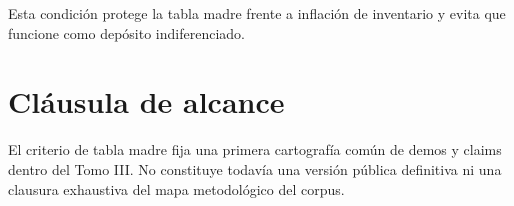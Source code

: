 \begin{observation}
Esta condición protege la tabla madre frente a inflación de inventario y evita que funcione como depósito indiferenciado.
\end{observation}

\section{Cláusula de alcance}
\begin{observation}
El criterio de tabla madre fija una primera cartografía común de demos y claims dentro del Tomo III. No constituye todavía una versión pública definitiva ni una clausura exhaustiva del mapa metodológico del corpus.
\end{observation}

